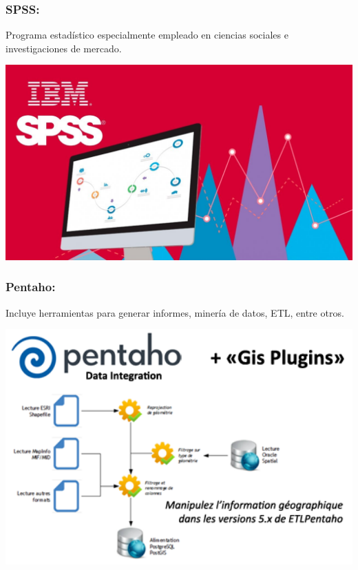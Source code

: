 \subsubsection{SPSS: }\label{sec:nada2}  
Programa estadístico especialmente empleado en ciencias sociales e investigaciones de mercado.
	\begin{center}
	\includegraphics[width=15cm]{./Imagenes/BIimagen14}
	\end{center}
	
\subsubsection{Pentaho: }\label{sec:nada2}  
Incluye herramientas para generar informes, minería de datos, ETL, entre otros.
	\begin{center}
	\includegraphics[width=15cm]{./Imagenes/BIimagen15}
	\end{center}
	
